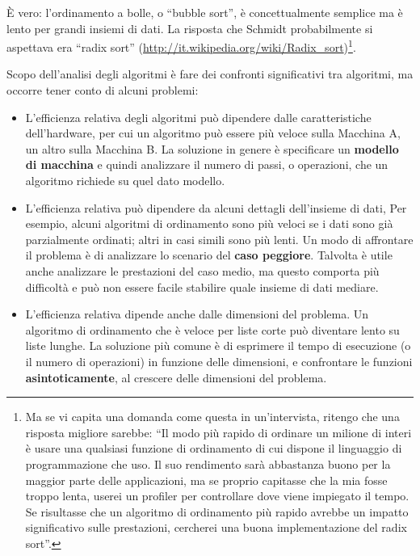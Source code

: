 \documentclass[10pt]{book}
\begin{document}
È vero: l'ordinamento a bolle, o ``bubble sort'', è concettualmente semplice ma è lento per grandi insiemi di dati. La risposta che Schmidt probabilmente si aspettava era ``radix sort'' (\url{http://it.wikipedia.org/wiki/Radix_sort})\footnote{Ma se vi capita una domanda come questa in un'intervista, ritengo che una risposta migliore sarebbe: ``Il modo più rapido di ordinare un milione di interi è usare una qualsiasi funzione di ordinamento di cui dispone il linguaggio di programmazione che uso. Il suo rendimento sarà abbastanza buono per la maggior parte delle applicazioni, ma se proprio capitasse che la mia fosse troppo lenta, userei un profiler per controllare dove viene impiegato il tempo. Se risultasse che un algoritmo di ordinamento più rapido avrebbe un impatto significativo sulle prestazioni, cercherei una buona implementazione del radix sort''.}.

Scopo dell'analisi degli algoritmi è fare dei confronti significativi tra algoritmi, ma occorre tener conto di alcuni problemi:

\begin{itemize}

\item L'efficienza relativa degli algoritmi può dipendere dalle caratteristiche dell'hardware, per cui un algoritmo può essere più veloce sulla Macchina A, un altro sulla Macchina B. La soluzione in genere è specificare un
{\bf modello di macchina} e quindi analizzare il numero di passi, o operazioni, che un algoritmo richiede su quel dato modello.

\item L'efficienza relativa può dipendere da alcuni dettagli dell'insieme di dati, Per esempio, alcuni algoritmi di ordinamento sono più veloci se i dati sono già parzialmente ordinati; altri in casi simili sono più lenti. Un modo di affrontare il problema è di analizzare lo scenario del {\bf caso peggiore}. Talvolta è utile anche analizzare le prestazioni del caso medio, ma questo comporta più difficoltà e può non essere facile stabilire quale insieme di dati mediare.

\item L'efficienza relativa dipende anche dalle dimensioni del problema. Un algoritmo di ordinamento che è veloce per liste corte può diventare lento su liste lunghe. La soluzione più comune è di esprimere il tempo di esecuzione (o il numero di operazioni) in funzione delle dimensioni, e confrontare le funzioni {\bf asintoticamente}, al crescere delle dimensioni del problema.

\end{itemize}
\end{document}
